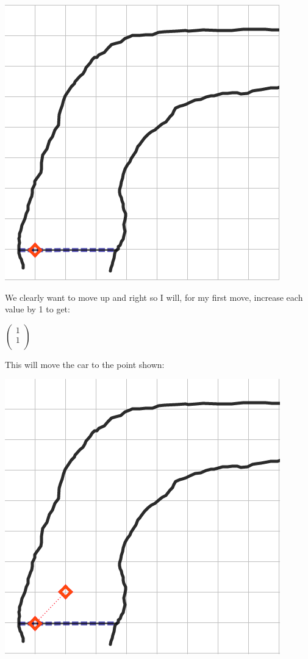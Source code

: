 \bigskip
\begin{center}
  \includegraphics[scale=0.6]{./Images/Sequences/VMR_1.png}
\end{center}

We clearly want to move up and right so I will, for my first move, increase each value by 1 to get:

\bigskip

$\left(
\begin{array}{c}
1\\
1\\
\end{array}
\right)$

\bigskip

This will move the car to the point shown:

\bigskip
\begin{center}
  \includegraphics[scale=0.6]{./Images/Sequences/VMR_2.png}
\end{center}

